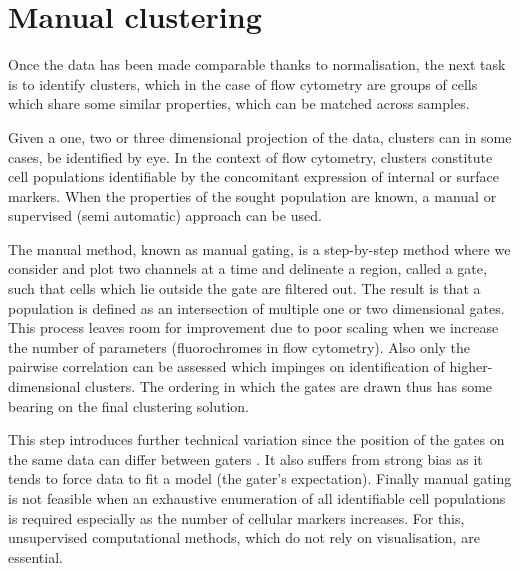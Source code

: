 \section{Manual clustering}

Once the data has been made comparable thanks to normalisation, the next task is to identify clusters, which in the case of flow cytometry are groups of cells which share some similar properties,
which can be matched across samples.  

Given a one, two or three dimensional projection of the data, clusters can in some cases, be identified by eye.
In the context of flow cytometry, clusters constitute cell populations identifiable by the concomitant expression of internal or surface markers.
When the properties of the sought population are known, a manual or supervised (semi automatic) approach can be used.

The manual method, known as manual gating,
is a step-by-step method where we consider and plot two channels at a time and delineate a region, called a gate, such that cells which lie outside the gate are filtered out.
The result is that a population is defined as an intersection of multiple one or two dimensional gates.
This process leaves room for improvement due to poor scaling when we increase the number of parameters (fluorochromes in flow cytometry).
Also only the pairwise correlation can be assessed which impinges
on identification of higher-dimensional clusters.
The ordering in which the gates are drawn thus has some bearing on the final clustering solution.

This step introduces further technical variation since the position of the gates
on the same data can differ between gaters \citep{Maecker:2010fg}.
It also suffers from strong bias as it tends to force data to fit a model (the gater's expectation).
Finally manual gating is not feasible when an exhaustive enumeration of all identifiable cell populations is required \citep{Siebert:2010iv,Aghaeepour:2012fq} especially
as the number of cellular markers increases.
For this, unsupervised computational methods, which do not rely on visualisation, are essential.


